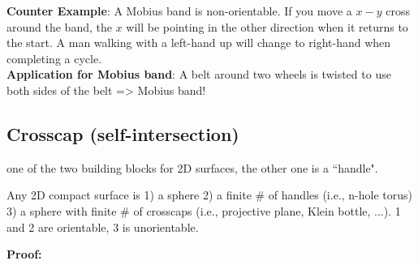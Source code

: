\documentclass[12pt]{article}
\begin{document}
{\bf Counter Example}: A Mobius band is non-orientable. 
If you move a $x-y$ cross around the band, the $x$ will be pointing in the other direction when it returns to the start.
A man walking with a left-hand up will change to right-hand when completing a cycle. \\

{\bf Application for Mobius band}: A belt around two wheels is twisted to use both sides of the belt => Mobius band! \\

\subsection{Crosscap (self-intersection)} one of the two building blocks for 2D surfaces, the other one is a ``handle".

Any 2D compact surface is 1) a sphere 2) a finite # of handles (i.e., n-hole torus) 3) a sphere with finite # of crosscaps (i.e., projective plane, Klein bottle, ...).
1 and 2 are orientable, 3 is unorientable.

{\bf Proof:} 
\end{document}
